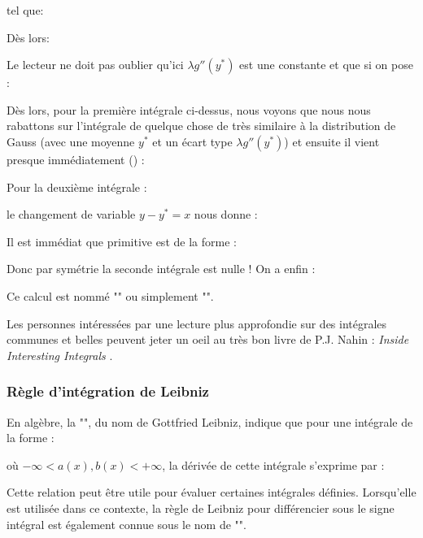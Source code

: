 \begin{enumerate}
		tel que:
		
		Dès lors:
		
		Le lecteur ne doit pas oublier qu'ici $\lambda g''(y^*)$ est une constante et que si on pose :
		
		Dès lors, pour la première intégrale ci-dessus, nous voyons que nous nous rabattons sur l'intégrale de quelque chose de très similaire à la distribution de Gauss (avec une moyenne $y^*$ et un écart type $\lambda g''(y^*)$) et ensuite il vient presque immédiatement () :
		
		Pour la deuxième intégrale :
		
		le changement de variable $y-y^*=x$ nous donne :
		
		Il est immédiat que primitive est de la forme :
		
		Donc par symétrie la seconde intégrale est nulle ! On a enfin :
		
		Ce calcul est nommé "\label{laplace method of integration}" ou simplement "".
	\end{enumerate}
	
	\begin{tcolorbox}[title=Remarque,colframe=black,arc=10pt]
	Les personnes intéressées par une lecture plus approfondie sur des intégrales communes et belles peuvent jeter un oeil au très bon livre de P.J. Nahin : \textit{Inside Interesting Integrals} \cite{nahin2014inside}.
	\end{tcolorbox}	
	
	\subsubsection{Règle d'intégration de Leibniz}
	En algèbre, la "\label{Leibniz's integral rule}", du nom de Gottfried Leibniz, indique que pour une intégrale de la forme :
	
	où $-\infty <a(x),b(x)<+\infty$, la dérivée de cette intégrale s'exprime par :
	
	Cette relation peut être utile pour évaluer certaines intégrales définies. Lorsqu'elle est utilisée dans ce contexte, la règle de Leibniz pour différencier sous le signe intégral est également connue sous le nom de "".
	
